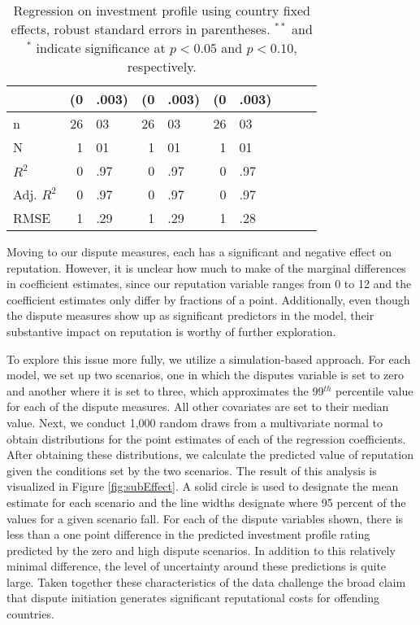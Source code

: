 \documentclass[12pt,onesided]{amsart}
\begin{document}
\begin{table}[ht]
{\begin{tabular}{lr@{} lr@{}lr@{}lr@{}lr@{}}
   & (0&.003) & (0&.003) & (0&.003) \\ 
   \hline
n & 26&03 & 26&03 & 26&03 \\ 
  N & 1&01 & 1&01 & 1&01 \\ 
  $R^{2}$ & 0&.97 & 0&.97 & 0&.97 \\ 
  Adj. $R^{2}$ & 0&.97 & 0&.97 & 0&.97 \\ 
  RMSE & 1&.29 & 1&.29 & 1&.28 \\ 
   \hline
\hline
\end{tabular}
}
\caption{Regression on investment profile using country fixed effects, robust standard errors in parentheses. $^{**}$ and $^{*}$ indicate significance at $p< 0.05 $ and $p< 0.10 $, respectively.} 
\label{tab:dispRepLevel}
\end{table}
\FloatBarrier


Moving to our dispute measures, each has a significant and negative effect on reputation. However, it is unclear how much to make of the marginal differences in coefficient estimates, since our reputation variable ranges from 0 to 12 and the coefficient estimates only differ by fractions of a point. Additionally, even though the dispute measures show up as significant predictors in the model, their substantive impact on reputation is worthy of further exploration. 

To explore this issue more fully, we utilize a simulation-based approach. For each model, we set up two scenarios, one in which the disputes variable is set to zero and another where it is set to three, which approximates the 99$^{th}$ percentile value for each of the dispute measures. All other covariates are set to their median value. Next, we conduct 1,000 random draws from a multivariate normal to obtain distributions for the point estimates of each of the regression coefficients. After obtaining these distributions, we calculate the predicted value of reputation given the conditions set by the two scenarios. The result of this analysis is visualized in Figure \ref{fig:subEffect}. A solid circle is used to designate the mean estimate for each scenario and the line widths designate where 95 percent of the values for a given scenario fall. For each of the dispute variables shown, there is less than a one point difference in the predicted investment profile rating predicted by the zero and high dispute scenarios. In addition to this relatively minimal difference, the level of uncertainty around these predictions is quite large. Taken together these characteristics of the data challenge the broad claim that dispute initiation generates significant reputational costs for offending countries.
\end{document}
